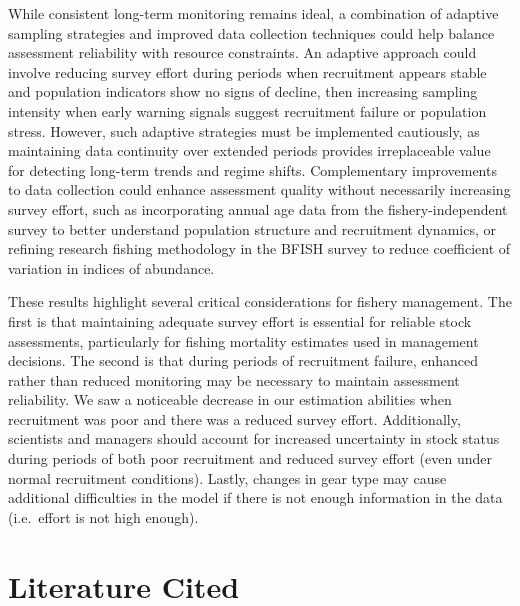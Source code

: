 \documentclass[
  letterpaper,
  12pt,
  letterpaper]{report}
\begin{document}
While consistent long-term monitoring remains ideal, a combination of
adaptive sampling strategies and improved data collection techniques
could help balance assessment reliability with resource constraints. An
adaptive approach could involve reducing survey effort during periods
when recruitment appears stable and population indicators show no signs
of decline, then increasing sampling intensity when early warning
signals suggest recruitment failure or population stress. However, such
adaptive strategies must be implemented cautiously, as maintaining data
continuity over extended periods provides irreplaceable value for
detecting long-term trends and regime shifts. Complementary improvements
to data collection could enhance assessment quality without necessarily
increasing survey effort, such as incorporating annual age data from the
fishery-independent survey to better understand population structure and
recruitment dynamics, or refining research fishing methodology in the
BFISH survey to reduce coefficient of variation in indices of abundance.

These results highlight several critical considerations for fishery
management. The first is that maintaining adequate survey effort is
essential for reliable stock assessments, particularly for fishing
mortality estimates used in management decisions. The second is that
during periods of recruitment failure, enhanced rather than reduced
monitoring may be necessary to maintain assessment reliability. We saw a
noticeable decrease in our estimation abilities when recruitment was
poor and there was a reduced survey effort. Additionally, scientists and
managers should account for increased uncertainty in stock status during
periods of both poor recruitment and reduced survey effort (even under
normal recruitment conditions). Lastly, changes in gear type may cause
additional difficulties in the model if there is not enough information
in the data (i.e.~effort is not high enough).


\chapter*{Literature Cited}\label{literature-cited}

\end{document}
